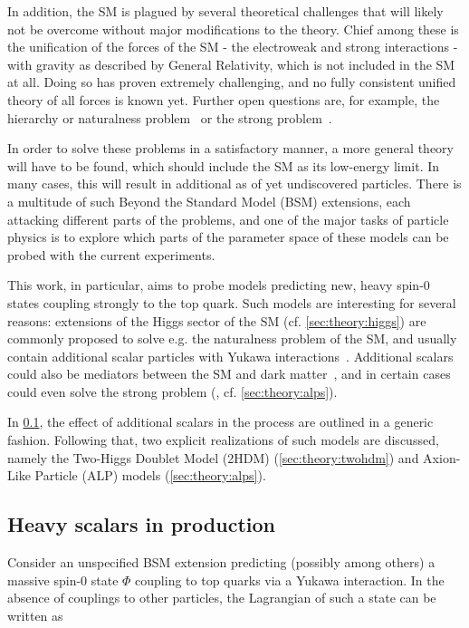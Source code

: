 In addition, the SM is plagued by several theoretical challenges that will likely not be overcome without major modifications to the theory. Chief among these is the unification of the forces of the SM - the electroweak and strong interactions - with gravity as described by General Relativity, which is not included in the SM at all. Doing so has proven extremely challenging, and no fully consistent unified theory of all forces is known yet. Further open questions are, for example, the hierarchy or naturalness problem~\cite{Nelson:1985,Koren:2020pio,Craig:2022eqo} or the strong \CP problem~\cite{Peccei:1977hh,Peccei:1977ur}.

In order to solve these problems in a satisfactory manner, a more general theory will have to be found, which should include the SM as its low-energy limit. In many cases, this will result in additional as of yet undiscovered particles. There is a multitude of such Beyond the Standard Model (BSM) extensions, each attacking different parts of the problems, and one of the major tasks of particle physics is to explore which parts of the parameter space of these models can be probed with the current experiments.

This work, in particular, aims to probe models predicting new, heavy spin-0 states coupling strongly to the top quark. 
Such models are interesting for several reasons: extensions of the Higgs sector of the SM (cf. \cref{sec:theory:higgs}) are commonly proposed to solve e.g. the naturalness problem of the SM, and usually contain additional scalar particles with Yukawa interactions~\cite{Branco:2011iw,Huitu:2019,Muhlleitner:2017dkd}. 
Additional scalars could also be mediators between the SM and dark matter~\cite{DMLHC:2015,Arina:2016}, and in certain cases could even solve the strong \CP problem (\cite{Dimopoulos:2016lvn,Gherghetta:2016fhp}, cf. \cref{sec:theory:alps}).

In \cref{sec:theory:ah}, the effect of additional scalars in the \pptt process are outlined in a generic fashion.
Following that, two explicit realizations of such models are discussed, namely the Two-Higgs Doublet Model (2HDM) (\cref{sec:theory:twohdm}) and Axion-Like Particle (ALP) models (\cref{sec:theory:alps}).

\subsection{Heavy scalars in \ttbartitle production}
\label{sec:theory:ah}

Consider an unspecified BSM extension predicting (possibly among others) a massive spin-0 state $\Phi$ coupling to top quarks via a Yukawa interaction. In the absence of couplings to other particles, the Lagrangian of such a state can be written as~\cite{Maltoni:2024tul}

